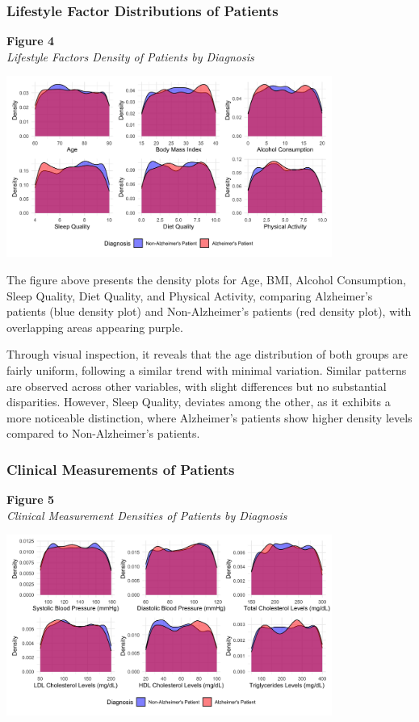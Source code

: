 \documentclass[12pt]{article}
\begin{document}
\subsubsection{Lifestyle Factor Distributions of Patients}
\noindent
\textbf{Figure 4}\\
\textit{Lifestyle Factors Density of Patients by Diagnosis}
\begin{center}
    \includegraphics[width = 0.8\textwidth]{Lifestyle Distributions.png}
\end{center}

The figure above presents the density plots for Age, BMI, Alcohol Consumption, Sleep Quality, Diet Quality, and Physical Activity, comparing Alzheimer's patients (blue density plot) and Non-Alzheimer's patients (red density plot), 
with overlapping areas appearing purple. 

Through visual inspection, it reveals that the age distribution of both groups are fairly uniform, following a similar trend with minimal variation. Similar patterns are observed across other variables, 
with slight differences but no substantial disparities. However, Sleep Quality, deviates among the other, as it exhibits a more noticeable distinction, where Alzheimer's patients show higher density levels compared to Non-Alzheimer's patients. 

\subsubsection{Clinical Measurements of Patients}
\noindent
\textbf{Figure 5}\\
\textit{Clinical Measurement Densities of Patients by Diagnosis}
\begin{center}
    \includegraphics[width = 0.8\textwidth]{Clinical Measures Distribution.png}
\end{center}
\end{document}
